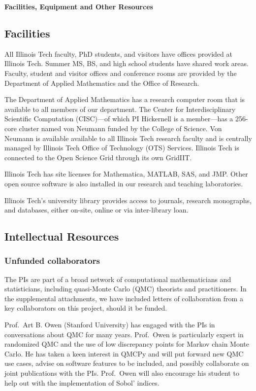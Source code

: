 \documentclass[11pt]{NSFamsart}
\begin{document}

\centerline{\textbf{\Large Facilities, Equipment and Other Resources}}

\bigskip

\subsection*{Facilities}
All Illinois Tech faculty, PhD students, and visitors have offices provided at Illinois Tech.  Summer 
MS, BS, and high school students have shared work areas.  Faculty, student and visitor 
offices and conference rooms are provided by the Department of Applied Mathematics and the Office of Research.

The Department of Applied Mathematics has a research computer room that is available to all 
members of our department.  The Center for Interdisciplinary Scientific Computation (CISC)---of which PI Hickernell is a member---has a 256-core cluster named von Neumann funded by the 
College of Science.  Von Neumann is 
available available to all Illinois Tech research faculty and is
centrally managed by Illinois Tech Office of Technology (OTS) Services.  Illinois Tech is connected 
to the Open Science Grid through its own GridIIT.  

Illinois Tech has site licenses for Mathematica, MATLAB, SAS, and JMP.  Other open source 
software is also installed in our research and teaching laboratories.

Illinois Tech's university library provides access to journals, research monographs, and 
databases, either on-site, online or via inter-library loan.

\subsection*{Intellectual Resources}
\phantom{a}

\subsubsection*{Unfunded collaborators} The PIs are part of a broad network of computational mathematicians and statisticians, including quasi-Monte Carlo (QMC) theorists and practitioners.  In the supplemental attachments, we have included letters of collaboration from a key collaborators on this project, should it be funded.

Prof.\ Art B. Owen (Stanford University) has engaged with the PIs in conversations about QMC for many years.  Prof.\ Owen is particularly expert in randomized QMC and the use of low discrepancy points for Markov chain Monte Carlo.  He has taken a keen interest in QMCPy and will put forward new QMC use cases, advise on software features to be included, and possibly collaborate on joint publications with the PIs.  Prof.\ Owen will also encourage his student to help out with the implementation of Sobol' indices.
\end{document}
